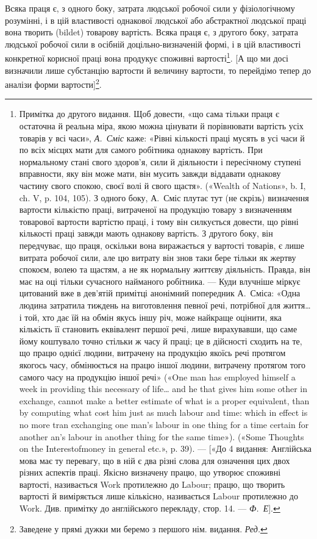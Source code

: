 Всяка праця є, з одного боку, затрата людської робочої сили
у фізіологічному розумінні, і в цій властивості однакової людської
або абстрактної людської праці вона творить (bildet) товарову
вартість. Всяка праця є, з другого боку, затрата людської робочої
сили в осібній доцільно-визначеній формі, і в цій властивості
конкретної корисної праці вона продукує споживні вартості\footnote{
Примітка до другого видання. Щоб довести, «що сама тільки праця є
остаточна й реальна міра, якою можна цінувати й порівнювати вартість
усіх товарів у всі часи», \emph{А.~Сміс} каже: «Рівні кількості праці мусять в
усі часи й по всіх місцях мати для самого робітника однакову вартість.
При нормальному стані свого здоров'я, сили й діяльности і пересічному
ступені вправности, яку він може мати, він мусить завжди віддавати однакову
частину свого спокою, своєї волі й свого щастя». («Wealth of Nations»,
b. I, ch. V, p. 104, 105). З одного боку, А.~Сміс плутає тут (не скрізь)
визначення вартости кількістю праці, витраченої на продукцію товару
з визначенням товарової вартости вартістю праці, і тому він силкується
довести, що рівні кількості праці завжди мають однакову вартість. З другого
боку, він передчуває, що праця, оскільки вона виражається у вартості
товарів, є лише витрата робочої сили, але цю витрату він знов таки
бере тільки як жертву спокоєм, волею та щастям, а не як нормальну життєву
діяльність. Правда, він має на оці тільки сучасного найманого робітника.
— Куди влучніше міркує цитований вже в дев’ятій примітці анонімний
попередник А.~Сміса: «Одна людина затратила тиждень на виготовлення
певної речі, потрібної для життя\dots{} і той, хто дає їй на обмін якусь
іншу річ, може найкраще оцінити, яка кількість її становить еквівалент
першої речі, лише вирахувавши, що саме йому коштувало точно стільки ж
часу й праці; це в дійсності сходить на те, що працю однієї людини, витрачену
на продукцію якоїсь речі протягом якогось часу, обмінюється
на працю іншої людини, витрачену протягом того самого часу на продукцію
іншої речі» («One man has employed himself a week in providing this
necessary of life\dots{} and he that gives him some other in exchange, cannot
make a better estimate of what is a proper equivalent, than by computing what
cost him just as much labour and time: which in effect is no more tran exchanging
one man’s labour in one thing for a time certain for another an’s labour
in another thing for the same time»). («Some Thoughts on the Interestofmoney
in general etc.», p. 39). — [«До 4 видання: Англійська мова має
ту перевагу, що в ній є два різні слова для означення цих двох різних аспектів
праці. Якісно визначену працю, що утворює споживні вартості,
називається Work протилежно до Labour; працю, що творить вартості
й виміряється лише кількісно, називається Labour протилежно до Work.
Див. примітку до англійського перекладу, стор. 14. — \emph{Ф.~Е}].}.
[А що ми досі визначили лише субстанцію вартости й величину
вартости, то перейдімо тепер до аналізи форми вартости]\footnote*{
Заведене у прямі дужки ми беремо з першого нім. видання. \emph{Ред.}
}.

